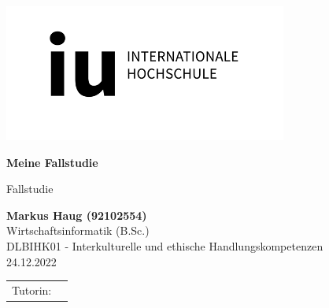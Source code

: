 \def\usesf{}
\let\usesf\sffamily %

\newsavebox{\Tutorin}


\setlength{\unitlength}{1pt}

\begin{titlepage}
\vspace{-39pt}\hspace*{300pt}\includegraphics[width=.21\paperwidth]{logos/IU.png}



\thispagestyle{empty}

\begin{center}
\hbox{}
\vfill
{\usesf}
{\huge\bfseries Meine Fallstudie \par}
\vskip 1.8cm
Fallstudie\\[2mm]
\vskip 1cm

{\large\bfseries Markus Haug (92102554)\\}
\vskip 1.2cm
Wirtschaftsinformatik (B.Sc.)\\
DLBIHK01 - Interkulturelle und ethische Handlungskompetenzen\\
24.12.2022
\vskip 3cm
\begin{tabular}{p{3cm}l}
Tutorin: & \usebox{\Tutorin} \\
\end{tabular}
\vfill
\end{center}

\end{titlepage}



